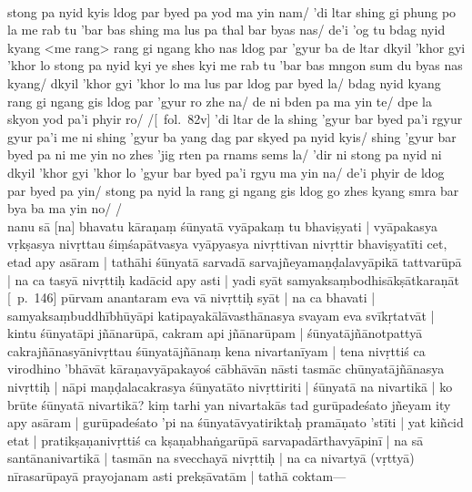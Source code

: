 \documentclass[12pt]{article}
\newcommand{\emdash} {\hspace{0em}—\hspace{0em}}
\begin{document}
\textbf{\TVB}\\
stong pa nyid kyis ldog par byed pa yod ma yin nam/ 'di ltar shing gi phung po la me rab tu 'bar bas shing ma lus pa thal bar byas nas/ de'i 'og tu bdag nyid kyang <me rang> rang gi ngang kho nas ldog par 'gyur ba de ltar dkyil 'khor gyi 'khor lo stong pa nyid kyi ye shes kyi me rab tu 'bar bas mngon sum du byas nas kyang/ dkyil 'khor gyi 'khor lo ma lus par ldog par byed la/ bdag nyid kyang rang gi ngang gis ldog par 'gyur ro zhe na/ de ni bden pa ma yin te/ dpe la skyon yod pa'i phyir ro/ /[\TVB\ fol.\ 82v] 'di ltar de la shing 'gyur bar byed pa'i rgyur gyur pa'i me ni shing 'gyur ba yang dag par skyed pa nyid kyis/ shing 'gyur bar byed pa ni me yin no zhes 'jig rten pa rnams sems la/ 'dir ni stong pa nyid ni dkyil 'khor gyi 'khor lo 'gyur bar byed pa'i rgyu ma yin na/ de'i phyir de ldog par byed pa yin/ stong pa nyid la rang gi ngang gis ldog go zhes kyang smra bar bya ba ma yin no/ /\\

nanu sā [na] bhavatu kāraṇaṃ śūnyatā vyāpakaṃ tu bhaviṣyati | vyāpakasya vṛkṣasya nivṛttau śiṃśapātvasya vyāpyasya nivṛttivan nivṛttir bhaviṣyatīti cet, etad apy asāram | tathāhi śūnyatā sarvadā sarvajñeyamaṇḍalavyāpikā tattvarūpā | na ca tasyā nivṛttiḥ kadācid apy asti | yadi syāt samyaksaṃbodhisākṣātkaraṇāt [\EDD\ p.\ 146] pūrvam anantaram eva vā nivṛttiḥ syāt | na ca bhavati | samyaksaṃbuddhībhūyāpi katipayakālāvasthānasya svayam eva svīkṛtatvāt | kintu śūnyatāpi jñānarūpā, cakram api jñānarūpam | śūnyatājñānotpattyā cakrajñānasyānivṛttau śūnyatājñānaṃ kena nivartanīyam | tena nivṛttiś ca virodhino 'bhāvāt kāraṇavyāpakayoś cābhāvān nāsti tasmāc chūnyatājñānasya nivṛttiḥ | nāpi maṇḍalacakrasya śūnyatāto nivṛttiriti | śūnyatā na nivartikā | ko brūte śūnyatā nivartikā? kiṃ tarhi yan nivartakās tad gurūpadeśato jñeyam ity apy asāram | gurūpadeśato 'pi na śūnyatāvyatiriktaḥ pramāṇato 'stīti | yat kiñcid etat | pratikṣaṇanivṛttiś ca kṣaṇabhaṅgarūpā sarvapadārthavyāpinī | na sā santānanivartikā | tasmān na svecchayā nivṛttiḥ | na ca nivartyā (vṛttyā) nīrasarūpayā prayojanam asti prekṣāvatām | tathā coktam\emdash \\
\end{document}

